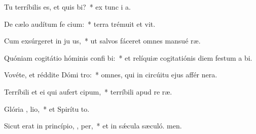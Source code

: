\item Tu terríbilis es, et quis  bi?~* ex tunc i a.
\item De cælo audítum fe cium:~* terra trémuit et vit.
\item Cum exsúrgeret in ju us,~* ut salvos fáceret omnes mansué ræ.
\item Quóniam cogitátio hóminis confi bi:~* et relíquiæ cogitatiónis diem festum a bi.
\item Vovéte, et réddite Dómi  tro:~* omnes, qui in circúitu ejus affér nera.
\item Terríbili et ei qui aufert  cipum,~* terríbili apud re ræ.
\item Glória ,  lio,~* et Spirítu to.
\item Sicut erat in princípio,  ,  per,~* et in sǽcula sæculó. men.
